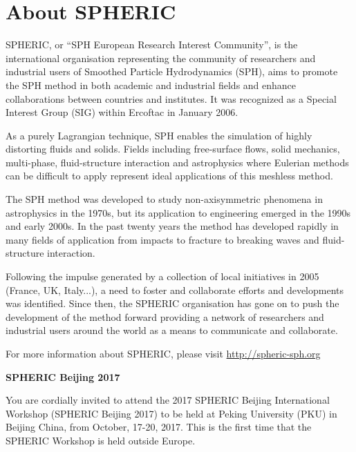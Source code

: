 \chapter*{About SPHERIC}
 \mtcaddchapter
\vspace{-5em}

SPHERIC, or ``SPH European Research Interest Community'', is the international organisation representing the community of researchers and industrial users of Smoothed Particle Hydrodynamics (SPH), aims to promote the SPH method in both academic and industrial fields and enhance collaborations between countries and institutes. It was recognized as a Special Interest Group (SIG) within Ercoftac in January 2006.

As a purely Lagrangian technique, SPH enables the simulation of highly distorting fluids and solids. Fields including free-surface flows, solid mechanics, multi-phase, fluid-structure interaction and astrophysics where Eulerian methods can be difficult to apply represent ideal applications of this meshless method.

The SPH method was developed to study non-axisymmetric phenomena in astrophysics in the 1970s, but its application to engineering emerged in the 1990s and early 2000s. In the past twenty years the method has developed rapidly in many fields of application from impacts to fracture to breaking waves and fluid-structure interaction.

Following the impulse generated by a collection of local initiatives in 2005 (France, UK, Italy...), a need to foster and collaborate efforts and developments was identified. Since then, the SPHERIC organisation has gone on to push the development of the method forward providing a network of researchers and industrial users around the world as a means to communicate and collaborate.

For more information about SPHERIC, please visit \url{http://spheric-sph.org}

\vspace{2em}
\textbf{\Large SPHERIC Beijing 2017}

You are cordially invited to attend the 2017 SPHERIC Beijing International Workshop (SPHERIC Beijing 2017) to be held at Peking University (PKU) in Beijing China, from October, 17-20, 2017. This is the first time that the SPHERIC Workshop is held outside Europe.

